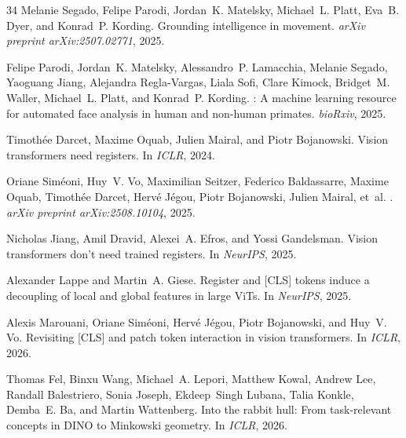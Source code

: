 \documentclass[10pt,twocolumn,letterpaper]{article}
\begin{document}
{\begin{thebibliography}{34}
Melanie Segado, Felipe Parodi, Jordan~K. Matelsky, Michael~L. Platt, Eva~B.
  Dyer, and Konrad~P. Kording.
\newblock Grounding intelligence in movement.
\newblock \emph{arXiv preprint arXiv:2507.02771}, 2025.

Felipe Parodi, Jordan~K. Matelsky, Alessandro~P. Lamacchia, Melanie Segado,
  Yaoguang Jiang, Alejandra Regla-Vargas, Liala Sofi, Clare Kimock, Bridget~M.
  Waller, Michael~L. Platt, and Konrad~P. Kording.
: A machine learning resource for automated face
  analysis in human and non-human primates.
\newblock \emph{bioRxiv}, 2025.

Timoth{\'e}e Darcet, Maxime Oquab, Julien Mairal, and Piotr Bojanowski.
\newblock Vision transformers need registers.
\newblock In \emph{ICLR}, 2024.

Oriane Sim{\'e}oni, Huy~V. Vo, Maximilian Seitzer, Federico Baldassarre, Maxime
  Oquab, Timoth{\'e}e Darcet, Herv{\'e} J{\'e}gou, Piotr Bojanowski, Julien
  Mairal, et~al.
.
\newblock \emph{arXiv preprint arXiv:2508.10104}, 2025.

Nicholas Jiang, Amil Dravid, Alexei~A. Efros, and Yossi Gandelsman.
\newblock Vision transformers don't need trained registers.
\newblock In \emph{NeurIPS}, 2025.

Alexander Lappe and Martin~A. Giese.
\newblock Register and {[CLS]} tokens induce a decoupling of local and global
  features in large {ViTs}.
\newblock In \emph{NeurIPS}, 2025.

Alexis Marouani, Oriane Sim{\'e}oni, Herv{\'e} J{\'e}gou, Piotr Bojanowski, and
  Huy~V. Vo.
\newblock Revisiting {[CLS]} and patch token interaction in vision
  transformers.
\newblock In \emph{ICLR}, 2026.

Thomas Fel, Binxu Wang, Michael~A. Lepori, Matthew Kowal, Andrew Lee, Randall
  Balestriero, Sonia Joseph, Ekdeep~Singh Lubana, Talia Konkle, Demba~E. Ba,
  and Martin Wattenberg.
\newblock Into the rabbit hull: From task-relevant concepts in {DINO} to
  {Minkowski} geometry.
\newblock In \emph{ICLR}, 2026.


\end{thebibliography}}
\end{document}

